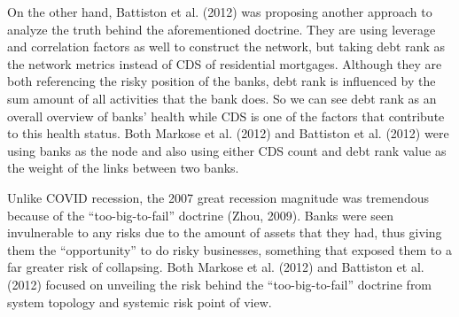 \documentclass[a4paper,11pt]{article}
\begin{document}
On the other hand, Battiston et al. (2012) was proposing another approach to analyze the truth behind the aforementioned doctrine. They are using leverage and correlation factors as well to construct the network, but taking debt rank as the network metrics instead of CDS of residential mortgages. Although they are both referencing the risky position of the banks, debt rank is influenced by the sum amount of all activities that the bank does. So we can see debt rank as an overall overview of banks’ health while CDS is one of the factors that contribute to this health status. Both Markose et al. (2012) and Battiston et al. (2012) were using banks as the node and also using either CDS count and debt rank value as the weight of the links between two banks.

Unlike COVID recession, the 2007 great recession magnitude was tremendous because of the “too-big-to-fail” doctrine (Zhou, 2009). Banks were seen invulnerable to any risks due to the amount of assets that they had, thus giving them the “opportunity” to do risky businesses, something that exposed them to a far greater risk of collapsing. Both Markose et al. (2012) and Battiston et al. (2012) focused on unveiling the risk behind the “too-big-to-fail” doctrine from system topology and systemic risk point of view.
\end{document}
